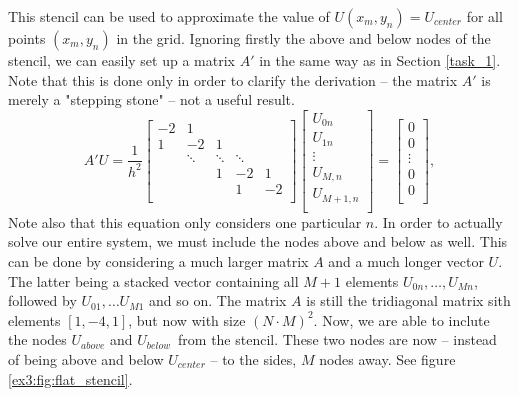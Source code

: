 This stencil can be used to approximate the value of $U(x_m, y_n) = U_{center}$ for all points $(x_m, y_n)$ in the grid.
Ignoring firstly the above and below nodes of the stencil, we can easily set up a matrix $A'$ in the same way as in Section \ref{task_1}.
Note that this is done only in order to clarify the derivation -- the matrix $A'$ is merely a "stepping stone" -- not a useful result.
\begin{equation*}
    A'U = \frac{1}{h^2}
    \begin{bmatrix}
    -2& 1 \\
    1 & -2 & 1 &   \\
      & \ddots & \ddots & \ddots & \\
      &   & 1 & -2 & 1 \\
      &   &  & 1 & -2 \\
    \end{bmatrix}
    \begin{bmatrix}
    U_{0n} \\ U_{1n} \\ \vdots \\ U_{M,n} \\ U_{M+1,n} \\
    \end{bmatrix}
    =
    \begin{bmatrix}
    0 \\ 0 \\ \vdots \\ 0 \\ 0 \\
    \end{bmatrix}
    ,
    \label{ex3:eq:simple_matrix}
\end{equation*}
Note also that this equation only considers one particular $n$.
In order to actually solve our entire system, we must include the nodes above and below as well.
This can be done by considering a much larger matrix $A$ and a much longer vector $U$.
The latter being a stacked vector containing all $M+1$ elements $U_{0n}, \ldots, U_{Mn}$, followed by $U_{01}, \ldots U_{M1}$ and so on.
The matrix $A$ is still the tridiagonal matrix sith elements $[1, -4, 1]$, but now with size $(N\cdot M)^2$.
Now, we are able to inclute the nodes $U_{above}$ and $U_{below}$ from the stencil.
These two nodes are now -- instead of being above and below $U_{center}$ -- to the sides, $M$ nodes away. See figure \ref{ex3:fig:flat_stencil}.


